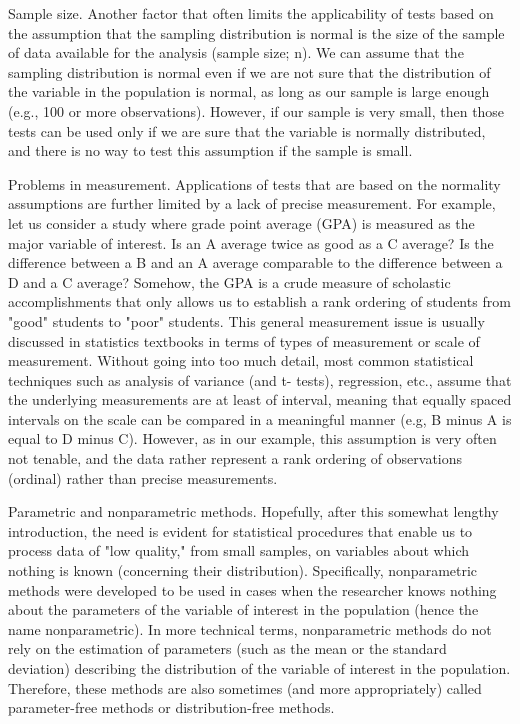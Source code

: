 Sample size. Another factor that often limits the applicability of tests based on the assumption that the sampling distribution is normal is the size of the sample of data available for the analysis (sample size; n). We can assume that the sampling distribution is normal even if we are not sure that the distribution of the variable in the population is normal, as long as our sample is large enough (e.g., 100 or more observations). However, if our sample is very small, then those tests can be used only if we are sure that the variable is normally distributed, and there is no way to test this assumption if the sample is small.

Problems in measurement. Applications of tests that are based on the normality assumptions are further limited by a lack of precise measurement. For example, let us consider a study where grade point average (GPA) is measured as the major variable of interest. Is an A average twice as good as a C average? Is the difference between a B and an A average comparable to the difference between a D and a C average? Somehow, the GPA is a crude measure of scholastic accomplishments that only allows us to establish a rank ordering of students from "good" students to "poor" students. This general measurement issue is usually discussed in statistics textbooks in terms of types of measurement or scale of measurement. Without going into too much detail, most common statistical techniques such as analysis of variance (and t- tests), regression, etc., assume that the underlying measurements are at least of interval, meaning that equally spaced intervals on the scale can be compared in a meaningful manner (e.g, B minus A is equal to D minus C). However, as in our example, this assumption is very often not tenable, and the data rather represent a rank ordering of observations (ordinal) rather than precise measurements.

Parametric and nonparametric methods. Hopefully, after this somewhat lengthy introduction, the need is evident for statistical procedures that enable us to process data of "low quality," from small samples, on variables about which nothing is known (concerning their distribution). Specifically, nonparametric methods were developed to be used in cases when the researcher knows nothing about the parameters of the variable of interest in the population (hence the name nonparametric). In more technical terms, nonparametric methods do not rely on the estimation of parameters (such as the mean or the standard deviation) describing the distribution of the variable of interest in the population. Therefore, these methods are also sometimes (and more appropriately) called parameter-free methods or distribution-free methods.

